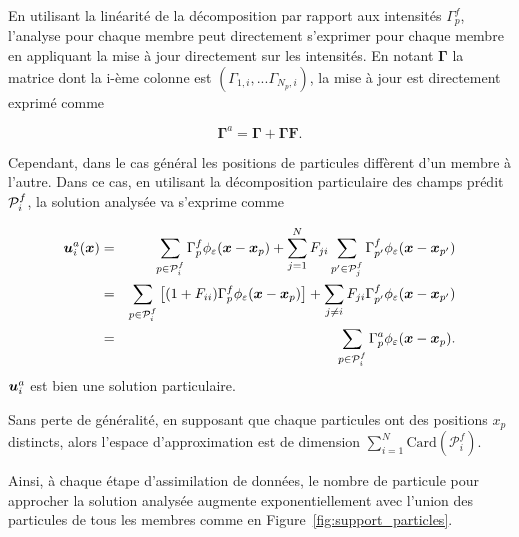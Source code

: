 En utilisant la linéarité de la décomposition par rapport aux intensités $\Gamma^f_{p}$, l'analyse pour chaque membre peut directement s'exprimer pour chaque membre en appliquant la mise à jour directement sur les intensités. En notant $\bm \Gamma$ la matrice dont la i-ème colonne est $(\Gamma_{1, i},...\Gamma_{N_p, i})$, la mise à jour est directement exprimé comme

\begin{equation*}
    \bm \Gamma^a = \bm \Gamma + \bm \Gamma \bm F.
\end{equation*}

Cependant, dans le cas général les positions de particules diffèrent d'un membre à l'autre. Dans ce cas, en utilisant la décomposition particulaire des champs prédit $\mathcal{P}_i^f$, la solution analysée va s'exprime comme

\begin{eqnarray*}
    \bm{u}_i^a(\bm{x}) &=& \sum_{p \in \mathcal{P}_i^f}\Gamma^f_p \phi_{\varepsilon}(\bm{x} - \bm{x}_p) + \sum_{j=1}^{N} F_{ji}  \sum_{p' \in \mathcal{P}_j^f}\Gamma^f_{p'} \phi_{\varepsilon}(\bm{x} - \bm{x}_{p'}) \\
    &=& \sum_{p \in \mathcal{P}_i^f}\left[(1 + F_{ii})\Gamma^f_p \phi_{\varepsilon}(\bm{x} - \bm{x}_{p})\right]   + \sum_{j\neq i} F_{ji} \Gamma^f_{p'} \phi_{\varepsilon}(\bm{x} - \bm{x}_{p'})\\
    &=& \sum_{p \in \mathcal{P}_i^f} \Gamma^a_p \phi_{\varepsilon}(\bm{x} - \bm{x}_p).
\end{eqnarray*}
$\bm{u}_i^a$ est bien une solution particulaire.


Sans perte de généralité, en supposant que chaque particules ont des positions $x_p$ distincts, alors l'espace d'approximation est de dimension $\sum_{i=1}^{N} \text{Card}(\mathcal{P}^f_i)$.

Ainsi, à chaque étape d'assimilation de données, le nombre de particule pour approcher la solution analysée augmente exponentiellement avec l'union des particules de tous les membres comme en Figure~\ref{fig:support_particles}.

